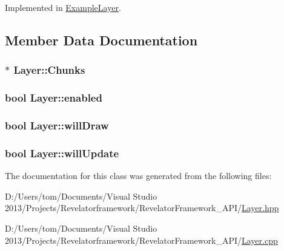 Implemented in \hyperlink{class_example_layer_a97b36d082a4b5dd7e145773fca666490}{Example\-Layer}.



\subsection{Member Data Documentation}
\hypertarget{class_layer_ab5408f6d27ad51d73df507296f16c811}{
\subsubsection[{Chunks}]{$\ast$ Layer\-::\-Chunks\hspace{0.3cm}{\ttfamily [protected]}}}\label{class_layer_ab5408f6d27ad51d73df507296f16c811}
\hypertarget{class_layer_af9f9c9a8c4a053bd829a06273df297bd}{
\subsubsection[{enabled}]{\setlength{\rightskip}{0pt plus 5cm}bool Layer\-::enabled\hspace{0.3cm}{\ttfamily [protected]}}}\label{class_layer_af9f9c9a8c4a053bd829a06273df297bd}
\hypertarget{class_layer_a64902a81921ba2fc792d044392b14ecc}{
\subsubsection[{will\-Draw}]{\setlength{\rightskip}{0pt plus 5cm}bool Layer\-::will\-Draw\hspace{0.3cm}{\ttfamily [protected]}}}\label{class_layer_a64902a81921ba2fc792d044392b14ecc}
\hypertarget{class_layer_a8c3badeb437135a265c931f4ee728a48}{
\subsubsection[{will\-Update}]{\setlength{\rightskip}{0pt plus 5cm}bool Layer\-::will\-Update\hspace{0.3cm}{\ttfamily [protected]}}}\label{class_layer_a8c3badeb437135a265c931f4ee728a48}


The documentation for this class was generated from the following files\-:\begin{DoxyCompactItemize}
\item 
D\-:/\-Users/tom/\-Documents/\-Visual Studio 2013/\-Projects/\-Revelatorframework/\-Revelator\-Framework\-\_\-\-A\-P\-I/\hyperlink{_layer_8hpp}{Layer.\-hpp}\item 
D\-:/\-Users/tom/\-Documents/\-Visual Studio 2013/\-Projects/\-Revelatorframework/\-Revelator\-Framework\-\_\-\-A\-P\-I/\hyperlink{_layer_8cpp}{Layer.\-cpp}\end{DoxyCompactItemize}
